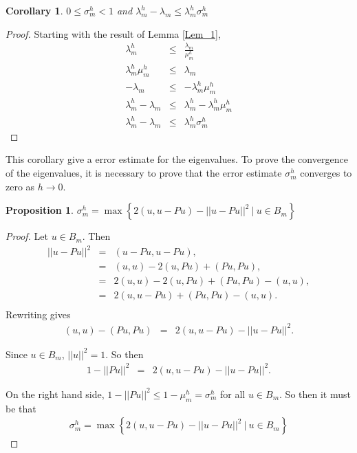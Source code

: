 \documentclass[../../main.tex]{subfiles}
\begin{document}
\newtheorem{Cor_1}{Corollary}
\begin{Cor_1}
	$0 \leq \sigma_{m}^{h} < 1$ and $\lambda_{m}^{h} - \lambda_{m} \leq \lambda_{m}^{h}\sigma_{m}^{h}$
\end{Cor_1}
\begin{proof}
	Starting with the result of Lemma \ref{Lem_1},
	\begin{eqnarray*}
		\lambda_{m}^{h} & \leq & \frac{\lambda_{m}}{\mu_{m}^{h}}\\
		\lambda_{m}^{h}\mu_{m}^{h}& \leq & \lambda_{m} \\
		-\lambda_{m}& \leq & -\lambda_{m}^{h}\mu_{m}^{h} \\
		\lambda_{m}^{h} -\lambda_{m}& \leq & \lambda_{m}^{h} -\lambda_{m}^{h}\mu_{m}^{h}\\
		\lambda_{m}^{h} -\lambda_{m}& \leq & \lambda_{m}^{h}\sigma_{m}^{h}
		\end{eqnarray*}
\end{proof}

This corollary give a error estimate for the eigenvalues. To prove the convergence of the eigenvalues, it is necessary to prove that the error estimate $\sigma_{m}^{h}$ converges to zero as $h \rightarrow 0$.


\newtheorem{Prop_3}[Prop_1]{Proposition} \label{Prop_3}
\begin{Prop_3}
	$\sigma_{m}^{h} = \max\left\{ 2( u,u-Pu )-||u-Pu||^{2} \ | \ u \in B_{m} \right\}$
\end{Prop_3}
\begin{proof}
	Let $u \in B_{m}$. Then
	\begin{eqnarray*}
		||u - Pu||^{2} &=& ( u - Pu, u - Pu ), \\
						&=& ( u, u ) - 2 ( u, Pu ) + ( Pu, Pu ), \\
						&=& 2( u, u ) - 2 ( u, Pu ) + ( Pu, Pu ) - ( u, u ),\\
						&=& 2( u, u - Pu ) + ( Pu, Pu ) - ( u, u ).\\
	\end{eqnarray*}
	Rewriting gives
	\begin{eqnarray*}
		( u, u ) - ( Pu, Pu )  & = & 2( u, u - Pu ) - ||u - Pu||^{2}.
	\end{eqnarray*}

	Since $u \in B_{m}$, $||u||^{2} = 1$. So then
	\begin{eqnarray*}
		1 - ||Pu||^{2}  & = & 2( u, u - Pu ) - ||u - Pu||^{2}.
	\end{eqnarray*}

	On the right hand side, $1 - ||Pu||^{2} \leq 1 - \mu_{m}^{h} = \sigma_{m}^{h}$ for all $u \in B_{m}$. So then it must be that
	\begin{eqnarray*}
	\sigma_{m}^{h} = \max\left\{ 2( u,u-Pu )-||u-Pu||^{2} \ | \ u \in B_{m} \right \}
	\end{eqnarray*}
\end{proof}
\end{document}
